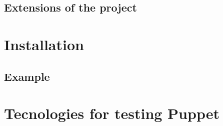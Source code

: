 \documentclass[12pt,a4paper,openright,twoside]{book}
\begin{document}





\subsection{Extensions of the project}

\section{Installation}

\subsection{Example}

\section{Tecnologies for testing Puppet}

\end{document}
